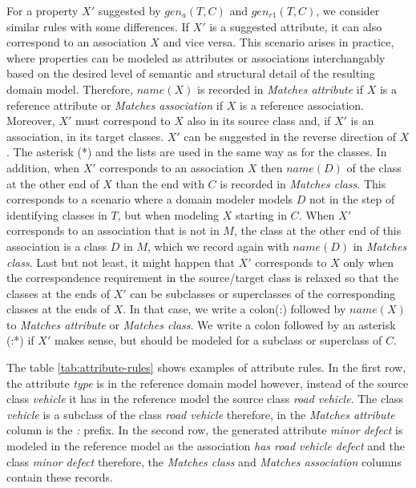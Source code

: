 For a property $X'$ suggested by $gen_a(T,C)$ and $gen_{r1}(T,C)$, we consider similar rules with some differences.
If $X'$ is a suggested attribute, it can also correspond to an association $X$ and vice versa.
This scenario arises in practice, where properties can be modeled as attributes or associations interchangably based on the desired level of semantic and structural detail of the resulting domain model.
Therefore, $name(X)$ is recorded in \emph{Matches attribute} if $X$ is a reference attribute or \emph{Matches association} if $X$ is a reference association.
Moreover, $X'$ must correspond to $X$ also in its source class and, if $X'$ is an association, in its target classes.
$X'$ can be suggested in the reverse direction of $X$.
The asterisk (*) and the lists are used in the same way as for the classes.
In addition, when $X'$ corresponds to an association $X$ then $name(D)$ of the class at the other end of $X$ than the end with $C$ is recorded in \emph{Matches class}.
This corresponds to a scenario where a domain modeler models $D$ not in the step of identifying classes in $T$, but when modeling $X$ starting in $C$.
When $X'$ corresponds to an association that is not in $M$, the class at the other end of this association is a class $D$ in $M$, which we record again with $name(D)$ in \emph{Matches class}.
Last but not least, it might happen that $X'$ corresponds to $X$ only when the correspondence requirement in the source/target class is relaxed so that the classes at the ends of $X'$ can be subclasses or superclasses of the corresponding classes at the ends of $X$.
In that case, we write a colon(:) followed by $name(X)$ to \emph{Matches attribute} or \emph{Matches class}.
We write a colon followed by an asterisk (:*) if $X'$ makes sense, but should be modeled for a subclass or superclass of $C$.

The table \ref{tab:attribute-rules} shows examples of attribute rules. In the first row, the attribute \textit{type} is in the reference domain model however, instead of the source class \textit{vehicle} it has in the reference model the source class \textit{road vehicle}. The class \textit{vehicle} is a subclass of the class \textit{road vehicle} therefore, in the \textit{Matches attribute} column is the \textit{:} prefix. In the second row, the generated attribute \textit{minor defect} is modeled in the reference model as the association \textit{has road vehicle defect} and the class \textit{minor defect} therefore, the \textit{Matches class} and \textit{Matches association} columns contain these records.



